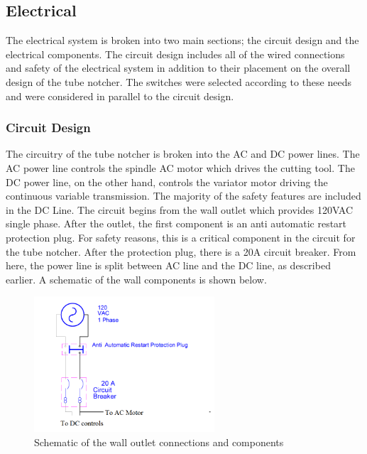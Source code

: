 \newpage

\subsection{Electrical}
The electrical system is broken into two main sections; the circuit design and the electrical components. The circuit design includes all of the wired connections and safety of the electrical system in addition to their placement on the overall design of the tube notcher. The switches were selected according to these needs and were considered in parallel to the circuit design.  
\subsubsection{Circuit Design}
The circuitry of the tube notcher is broken into the AC and DC power lines. The AC power line controls the spindle AC motor which drives the cutting tool. The DC power line, on the other hand, controls the variator motor driving the continuous variable transmission. The majority of the safety features are included in the DC Line. The circuit begins from the wall outlet which provides 120VAC single phase. After the outlet, the first component is an anti automatic restart protection plug. For safety reasons, this is a critical component in the circuit for the tube notcher. After the protection plug, there is a 20A circuit breaker. From here, the power line is split between AC line and the DC line, as described earlier. A schematic of the wall components is shown below. 

\begin{figure}[H]
    \centering
    \includegraphics[width=0.6\textwidth]{./fall-report pictures/Chapter2-MachineDescription/Wall}
    \caption{Schematic of the wall outlet connections and components}
    \label{fig:Electrical:Wall}
\end{figure}

